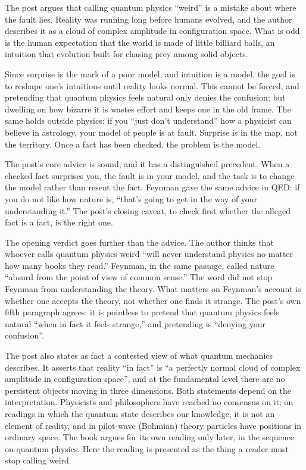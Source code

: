 \begin{afterword}
\summaryhead

The post argues that calling quantum physics ``weird'' is a mistake about where the fault lies. Reality was running long before humans evolved, and the author describes it as a cloud of complex amplitude in configuration space. What is odd is the human expectation that the world is made of little billiard balls, an intuition that evolution built for chasing prey among solid objects.

Since surprise is the mark of a poor model, and intuition is a model, the goal is to reshape one's intuitions until reality looks normal. This cannot be forced, and pretending that quantum physics feels natural only denies the confusion; but dwelling on how bizarre it is wastes effort and keeps one in the old frame. The same holds outside physics: if you ``just don't understand'' how a physicist can believe in astrology, your model of people is at fault. Surprise is in the map, not the territory. Once a fact has been checked, the problem is the model.

\responsehead

The post's core advice is sound, and it has a distinguished precedent. When a checked fact surprises you, the fault is in your model, and the task is to change the model rather than resent the fact. Feynman gave the same advice in \textsc{QED}: if you do not like how nature is, ``that's going to get in the way of your understanding it.'' The post's closing caveat, to check first whether the alleged fact is a fact, is the right one.

The opening verdict goes further than the advice. The author thinks that whoever calls quantum physics weird ``will never understand physics no matter how many books they read.'' Feynman, in the same passage, called nature ``absurd from the point of view of common sense.'' The word did not stop Feynman from understanding the theory. What matters on Feynman's account is whether one accepts the theory, not whether one finds it strange. The post's own fifth paragraph agrees: it is pointless to pretend that quantum physics feels natural ``when in fact it feels strange,'' and pretending is ``denying your confusion''.

The post also states as fact a contested view of what quantum mechanics describes. It asserts that reality ``in fact'' is ``a perfectly normal cloud of complex amplitude in configuration space'', and at the fundamental level there are no persistent objects moving in three dimensions. Both statements depend on the interpretation. Physicists and philosophers have reached no consensus on it; on readings in which the quantum state describes our knowledge, it is not an element of reality, and in pilot-wave (Bohmian) theory particles have positions in ordinary space. The book argues for its own reading only later, in the sequence on quantum physics. Here the reading is presented as the thing a reader must stop calling weird.


\end{afterword}
